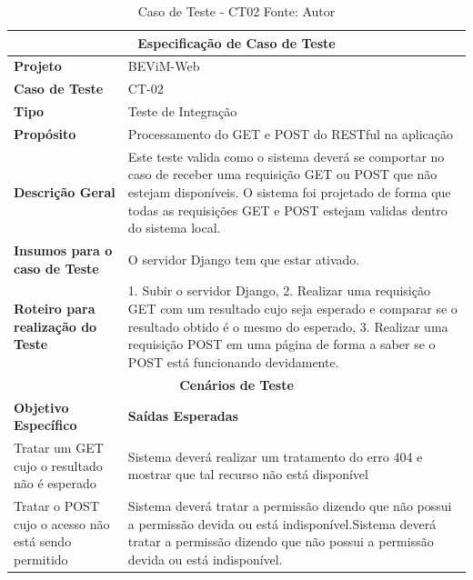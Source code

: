\begin{table}[H]
    \begin{center}
        \begin{tabular}{|p{5cm}|p{12cm}|}
            \hline
            \multicolumn{2}{|c|}{\textbf{Especificação de Caso de Teste}} \\ \hline
                \textbf{Projeto}                                        & BEViM-Web \\ \hline
                \textbf{Caso de Teste}                             & CT-02 \\ \hline
                \textbf{Tipo}                                             & Teste de Integração \\ \hline
                \textbf{Propósito}                                     & Processamento do GET e POST do RESTful na aplicação \\ \hline
                \textbf{Descrição Geral}                           & Este teste valida como o sistema deverá se comportar no caso de receber uma requisição GET ou POST que não estejam disponíveis. O sistema foi projetado de forma que todas as requisições GET e POST estejam validas dentro do sistema local. \\ \hline
                \textbf{Insumos para o caso de Teste}    & O servidor Django tem que estar ativado. \\ \hline
                \textbf{Roteiro para realização do Teste}&  1. Subir o servidor Django, 2. Realizar uma requisição GET com um resultado cujo seja esperado e comparar se o resultado obtido é o mesmo do esperado, 3. Realizar uma requisição POST em uma página de forma a saber se o POST está funcionando devidamente. \\ \hline
            \multicolumn{2}{|c|}{\textbf{Cenários de Teste}} \\ \hline
                \textbf{Objetivo Específico}                      & \textbf{Saídas Esperadas} \\ \hline
                Tratar um GET cujo o resultado não é esperado & Sistema deverá realizar um tratamento do erro 404 e mostrar que tal recurso não está disponível \\ \hline
                Tratar o POST cujo o acesso não está sendo permitido & Sistema deverá tratar a permissão dizendo que não possui a permissão devida ou está indisponível.Sistema deverá tratar a permissão dizendo que não possui a permissão devida ou está indisponível. \\ \hline
        \end{tabular}
    \end{center}
    \caption[Caso de Teste - CT02]{Caso de Teste - CT02
    \protect Fonte: Autor}
    \label{CT-02}
\end{table}

